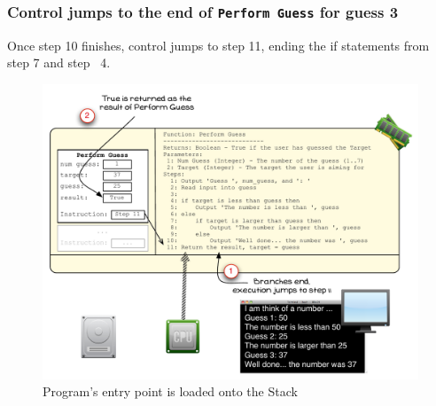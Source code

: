 
\clearpage

\subsubsection{Control jumps to the end of \texttt{Perform Guess} for guess 3} %
\label{ssub:control_jumps_to_step_11_for_guess_3}

Once step 10 finishes, control jumps to step 11, ending the if statements from step 7 and step~ 4.

\begin{figure}[htbp]
   \centering
   \includegraphics[width=\textwidth]{./topics/control-flow/images/PerformGuess12} 
   \caption{Program's entry point is loaded onto the Stack}
   \label{fig:perform-guess-12}
\end{figure}

